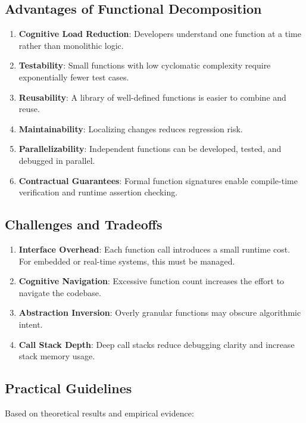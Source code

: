 \documentclass[a4paper,12pt]{article}
\theoremstyle{definition}
\begin{document}
\subsection{Advantages of Functional Decomposition}

\begin{enumerate}
	\item \textbf{Cognitive Load Reduction}: Developers understand one function at a time rather than monolithic logic.
	\item \textbf{Testability}: Small functions with low cyclomatic complexity require exponentially fewer test cases.
	\item \textbf{Reusability}: A library of well-defined functions is easier to combine and reuse.
	\item \textbf{Maintainability}: Localizing changes reduces regression risk.
	\item \textbf{Parallelizability}: Independent functions can be developed, tested, and debugged in parallel.
	\item \textbf{Contractual Guarantees}: Formal function signatures enable compile-time verification and runtime assertion checking.
\end{enumerate}

\subsection{Challenges and Tradeoffs}

\begin{enumerate}
	\item \textbf{Interface Overhead}: Each function call introduces a small runtime cost. For embedded or real-time systems, this must be managed.
	\item \textbf{Cognitive Navigation}: Excessive function count increases the effort to navigate the codebase.
	\item \textbf{Abstraction Inversion}: Overly granular functions may obscure algorithmic intent.
	\item \textbf{Call Stack Depth}: Deep call stacks reduce debugging clarity and increase stack memory usage.
\end{enumerate}

\subsection{Practical Guidelines}

Based on theoretical results and empirical evidence:
\end{document}
